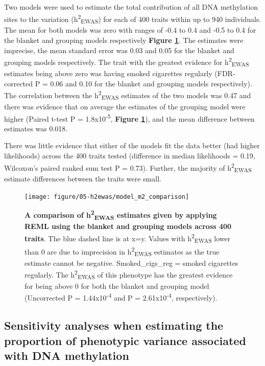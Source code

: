 \documentclass[11pt,twoside]{bristolthesis}
\begin{document}
Two models were used to estimate the total contribution of all DNA methylation sites to the variation (h\textsuperscript{2}\textsubscript{EWAS}) for each of 400 traits within up to 940 individuals. The mean for both models was zero with ranges of -0.4 to 0.4 and -0.5 to 0.4 for the blanket and grouping models respectively \textbf{Figure \ref{fig:h2ewas-estimates}}. The estimates were imprecise, the mean standard error was 0.03 and 0.05 for the blanket and grouping models respectively. The trait with the greatest evidence for h\textsuperscript{2}\textsubscript{EWAS} estimates being above zero was having smoked cigarettes regularly (FDR-corrected P = 0.06 and 0.10 for the blanket and grouping models respectively). The correlation between the h\textsuperscript{2}\textsubscript{EWAS} estimates of the two models was 0.47 and there was evidence that on average the estimates of the grouping model were higher (Paired t-test P = 1.8x10\textsuperscript{-5}, \textbf{Figure \ref{fig:h2ewas-estimates}}), and the mean difference between estimates was 0.018.

There was little evidence that either of the models fit the data better (had higher likelihoods) across the 400 traits tested (difference in median likelihoods = 0.19, Wilcoxon's paired ranked sum test P = 0.73). Further, the majority of h\textsuperscript{2}\textsubscript{EWAS} estimate differences between the traits were small.




\begin{figure}

{\centering \texttt{[image: figure/05-h2ewas/model\_m2\_comparison]} 

}

\caption[A comparison of h\textsuperscript{2}\textsubscript{EWAS} estimates given by applying REML using the blanket and grouping models across 400 traits]{\textbf{A comparison of h\textsuperscript{2}\textsubscript{EWAS} estimates given by applying REML using the blanket and grouping models across 400 traits}. The blue dashed line is at x=y. Values with h\textsuperscript{2}\textsubscript{EWAS} lower than 0 are due to imprecision in h\textsuperscript{2}\textsubscript{EWAS} estimates as the true estimate cannot be negative. Smoked\_cigs\_reg = smoked cigarettes regularly. The h\textsuperscript{2}\textsubscript{EWAS} of this phenotype has the greatest evidence for being above 0 for both the blanket and grouping model (Uncorrected P = 1.44x10\textsuperscript{-4} and P = 2.61x10\textsuperscript{-4}, respectively).}\label{fig:h2ewas-estimates}
\end{figure}
\hypertarget{results-sensitivity-analyses-05}{%
\subsection{Sensitivity analyses when estimating the proportion of phenotypic variance associated with DNA methylation}\label{results-sensitivity-analyses-05}}
\end{document}
